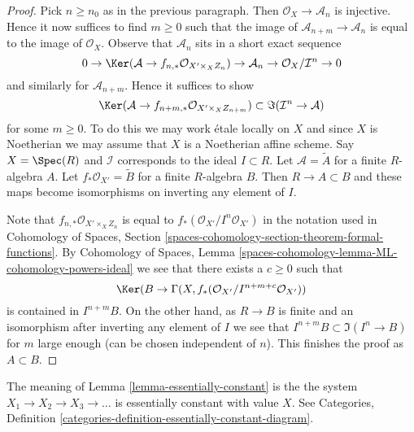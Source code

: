 \begin{proof}
\medskip\noindent
Pick $n \geq n_0$ as in the previous paragraph. Then
$\mathcal{O}_X \to \mathcal{A}_n$ is injective. Hence it now
suffices to find $m \geq 0$ such that the image of
$\mathcal{A}_{n + m} \to \mathcal{A}_n$ is equal
to the image of $\mathcal{O}_X$. Observe that $\mathcal{A}_n$
sits in a short exact sequence
$$
0 \to \Ker(\mathcal{A} \to f_{n, *}\mathcal{O}_{X' \times_X Z_n})
\to \mathcal{A}_n \to \mathcal{O}_X/\mathcal{I}^n \to 0
$$
and similarly for $\mathcal{A}_{n + m}$. Hence it suffices to show
$$
\Ker(\mathcal{A} \to f_{n + m, *}\mathcal{O}_{X' \times_X Z_{n + m}})
\subset
\Im(\mathcal{I}^n \to \mathcal{A})
$$
for some $m \geq 0$. To do this we may work \'etale locally on
$X$ and since $X$ is Noetherian we may assume that $X$ is
a Noetherian affine scheme. Say $X = \Spec(R)$ and $\mathcal{I}$
corresponds to the ideal $I \subset R$. Let $\mathcal{A} = \widetilde{A}$
for a finite $R$-algebra $A$. Let $f_*\mathcal{O}_{X'} = \widetilde{B}$
for a finite $R$-algebra $B$. Then $R \to A \subset B$ and these maps
become isomorphisms on inverting any element of $I$.

\medskip\noindent
Note that $f_{n, *}\mathcal{O}_{X' \times_X Z_n}$
is equal to $f_*(\mathcal{O}_{X'}/I^n\mathcal{O}_{X'})$
in the notation used in Cohomology of Spaces, Section
\ref{spaces-cohomology-section-theorem-formal-functions}.
By Cohomology of Spaces, Lemma
\ref{spaces-cohomology-lemma-ML-cohomology-powers-ideal}
we see that there exists a $c \geq 0$ such that
$$
\Ker(B \to \Gamma(X, f_*(\mathcal{O}_{X'}/I^{n + m + c}\mathcal{O}_{X'}))
$$
is contained in $I^{n + m}B$. On the other hand, as $R \to B$ is
finite and an isomorphism after inverting any element of $I$
we see that $I^{n + m}B \subset \Im(I^n \to B)$ for $m$ large enough
(can be chosen independent of $n$). This finishes the proof as $A \subset B$.
\end{proof}

\begin{remark}
\label{remark-essentially-constant}
The meaning of Lemma \ref{lemma-essentially-constant}
is the the system $X_1 \to X_2 \to X_3 \to \ldots$ is essentially
constant with value $X$. See Categories, Definition
\ref{categories-definition-essentially-constant-diagram}.
\end{remark}















